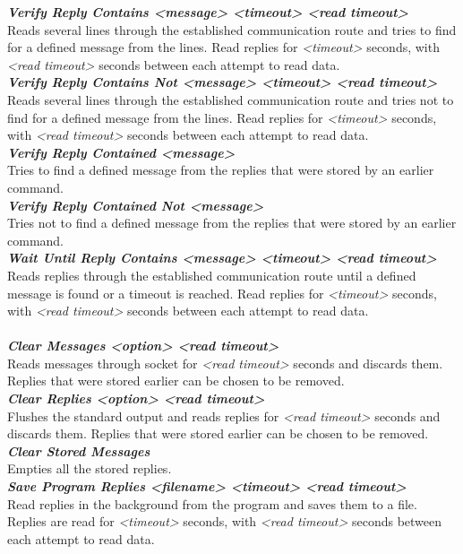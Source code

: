 \documentclass[english,12pt,a4paper,pdftex,elec,utf8]{aaltothesis}
\begin{document}
\textit{\textbf{Verify Reply Contains  <message> <timeout> <read timeout>}}\\
Reads several lines through the established communication route and tries to find for a defined message from the lines. Read replies for \textit{<timeout>} seconds, with \textit{<read timeout>} seconds between each attempt to read data.\\
\textit{\textbf{Verify Reply Contains Not  <message> <timeout> <read timeout>}}\\
Reads several lines through the established communication route and tries not to find for a defined message from the lines. Read replies for \textit{<timeout>} seconds, with \textit{<read timeout>} seconds between each attempt to read data.\\
\textit{\textbf{Verify Reply Contained  <message>}}\\
Tries to find a defined message from the replies that were stored by an earlier command. \\
\textit{\textbf{Verify Reply Contained Not  <message>}}\\
Tries not to find a defined message from the replies that were stored by an earlier command. \\
\textit{\textbf{Wait Until Reply Contains  <message> <timeout> <read timeout>}}\\
Reads replies through the established communication route until a defined message is found or a timeout is reached. Read replies for \textit{<timeout>} seconds, with \textit{<read timeout>} seconds between each attempt to read data.\\\\
\textit{\textbf{Clear Messages  <option> <read timeout>}}\\
Reads messages through socket for \textit{<read timeout>} seconds and discards them. Replies that were stored earlier can be chosen to be removed.\\
\textit{\textbf{Clear Replies  <option> <read timeout>}}\\
Flushes the standard output and reads replies for \textit{<read timeout>} seconds and discards them. Replies that were stored earlier can be chosen to be removed.\\
\textit{\textbf{Clear Stored Messages}}\\
Empties all the stored replies.\\
\textit{\textbf{Save Program Replies  <filename> <timeout> <read timeout>}}\\
Read replies in the background from the program and saves them to a file. Replies are read for \textit{<timeout>} seconds, with \textit{<read timeout>} seconds between each attempt to read data.\\
\end{document}
